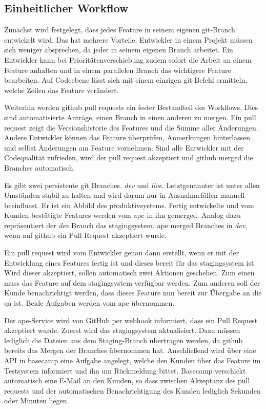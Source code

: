 
\subsection{Einheitlicher Workflow} %
\label{sub:einheitlicher_workflow}

Zunächst wird festgelegt, dass jedes Feature in seinem eigenen \gls{git}-Branch entwickelt wird. Das hat mehrere Vorteile. Entwickler in einem Projekt müssen sich weniger absprechen, da jeder in seinem eigenen Branch arbeitet. Ein Entwickler kann bei Prioritätenverschiebung zudem sofort die Arbeit an einem Feature anhalten und in einem parallelen Branch das wichtigere Feature bearbeiten. Auf Codeebene lässt sich mit einem einzigen \gls{git}-Befehl ermitteln, welche Zeilen das Feature verändert.

Weiterhin werden \gls{github} \glspl{pull request} ein fester Bestandteil des Workflows. Dies sind automatisierte Anträge, einen Branch in einen anderen zu mergen. Ein \gls{pull request} zeigt die Versionshistorie des Features und die Summe aller Änderungen. Andere Entwickler können das Feature überprüfen, Anmerkungen hinterlassen und selbst Änderungen am Feature vornehmen. Sind alle Entwickler mit der Codequalität zufrieden, wird der \gls{pull request} akzeptiert und \gls{github} merged die Branches automatisch.

Es gibt zwei persistente \gls{git} Branches. \emph{dev} und \emph{live}. Letztgenannter ist unter allen Umständen stabil zu halten und wird darum nur in Ausnahmefällen manuell beeinflusst. Er ist ein Abbild des \gls{produktivsystem}s. Fertig entwickelte und vom Kunden bestätigte Features werden vom \gls{ape} in ihn gemerged. Analog dazu repräsentiert der \emph{dev} Branch das \gls{stagingsystem}. \gls{ape} merged Branches in \emph{dev}, wenn auf \gls{github} ein Pull Request akzeptiert wurde.

Ein \gls{pull request} wird vom Entwickler genau dann erstellt, wenn er mit der Entwicklung eines Features fertig ist und dieses bereit für das \gls{stagingsystem} ist. Wird dieser akzeptiert, sollen automatisch zwei Aktionen geschehen. Zum einen muss das Feature auf dem \gls{stagingsystem} verfügbar werden. Zum anderen soll der Kunde benachrichtigt werden, dass dieses Feature nun bereit zur Übergabe an die \gls{qa} ist. Beide Aufgaben werden vom \gls{ape} übernommen.

Der \gls{ape}-Service wird von GitHub per \Gls{webhook} informiert, dass ein Pull Request akzeptiert wurde. Zuerst wird das \gls{stagingsystem} aktualisiert. Dazu müssen lediglich die Dateien aus dem Staging-Branch übertragen werden, da \gls{github} bereits das Mergen der Branches übernommen hat. Anschließend wird über eine API in \gls{basecamp} eine Aufgabe angelegt, welche den Kunden über das Feature im Testsystem informiert und ihn um Rückmeldung bittet. Basecamp verschickt automatisch eine E-Mail an den Kunden, so dass zwischen Akzeptanz des \glspl{pull request} und der automatischen Benachrichtigung des Kunden lediglich Sekunden oder Minuten liegen.

